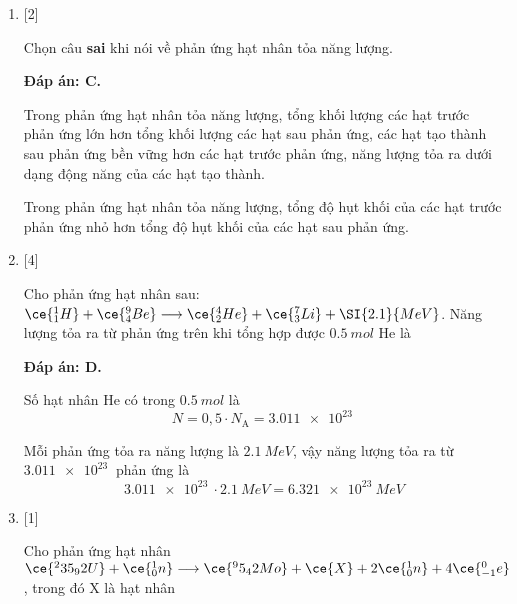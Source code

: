 \begin{enumerate}[label=\bfseries Câu \arabic*:]
	\item {} [2]
	\cauhoi
	{Chọn câu \textbf{sai} khi nói về phản ứng hạt nhân tỏa năng lượng.
	}
	
	\loigiai
	{		\textbf{Đáp án: C.}
		
		Trong phản ứng hạt nhân tỏa năng lượng, tổng khối lượng các hạt trước phản ứng lớn hơn tổng khối lượng các hạt sau phản ứng, các hạt tạo thành sau phản ứng bền vững hơn các hạt trước phản ứng, năng lượng tỏa ra dưới dạng động năng của các hạt tạo thành.
		
		Trong phản ứng hạt nhân tỏa năng lượng, tổng độ hụt khối của các hạt trước phản ứng nhỏ hơn tổng độ hụt khối của các hạt sau phản ứng.
		
	}
	\item {} [4]
	\cauhoi
	{Cho phản ứng hạt nhân sau: $\ce{^1_1 H} + \ce{^9_4 Be} \longrightarrow \ce{^4_2 He} + \ce{^7_3 Li} + \SI{2.1}{MeV}$. Năng lượng tỏa ra từ phản ứng trên khi tổng hợp được $\SI{0.5}{mol}$ He là
	}
	
	\loigiai
	{		\textbf{Đáp án: D.}
		
		Số hạt nhân He có trong $\SI{0.5}{mol}$ là
		$$N=0,5 \cdot N_\text{A} = \SI{3.011e23}{}$$
		
		Mỗi phản ứng tỏa ra năng lượng là $\SI{2.1}{MeV}$, vậy năng lượng tỏa ra từ $\SI{3.011e23}{}$ phản ứng là
		$$\SI{3.011e23}{} \cdot \SI{2.1}{MeV} = \SI{6.321e23}{MeV}$$
		
	}
	\item {} [1]
	\cauhoi
	{Cho phản ứng hạt nhân $\ce{^235_92 U} + \ce{^1_0 n} \longrightarrow \ce{^95_42 Mo} + \ce{X} + 2\ce{^1_0 n} + 4\ce{^0_{-1} e}$, trong đó X là hạt nhân
	}
	

\end{enumerate}
